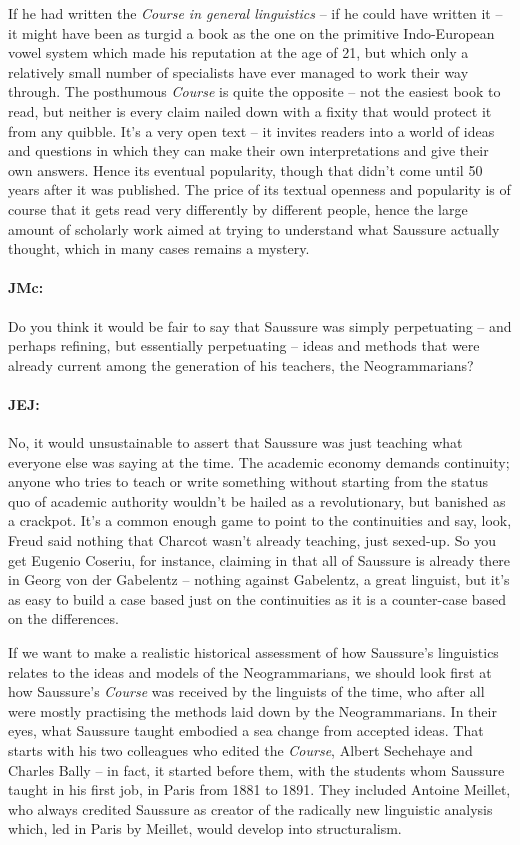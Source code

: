 \documentclass[output=paper]{langscibook}
\begin{document}
If he had written the \textit{Course in general linguistics} – if he could have written it – it might have been as turgid a book as the one on the primitive Indo-European vowel system which made his reputation at the age of 21, but which only a relatively small number of specialists have ever managed to work their way through. The posthumous \textit{Course} is quite the opposite – not the easiest book to read, but neither is every claim nailed down with a fixity that would protect it from any quibble. It’s a very open text – it invites readers into a world of ideas and questions in which they can make their own interpretations and give their own answers. Hence its eventual popularity, though that didn’t come until 50 years after it was published. The price of its textual openness and popularity is of course that it gets read very differently by different people, hence the large amount of scholarly work aimed at trying to understand what Saussure actually thought, which in many cases remains a mystery.


\paragraph*{JMc:}  Do you think it would be fair to say that Saussure was simply perpetuating – and perhaps refining, but essentially perpetuating – ideas and methods that were already current among the generation of his teachers, the Neogrammarians?


\paragraph*{JEJ:}  No, it would unsustainable to assert that Saussure was just teaching what everyone else was saying at the time. The academic economy demands continuity; anyone who tries to teach or write something without starting from the status quo of academic authority wouldn’t be hailed as a revolutionary, but banished as a crackpot. It’s a common enough game to point to the continuities and say, look, Freud said nothing that Charcot wasn’t already teaching, just sexed-up. So you get Eugenio Coseriu, for instance, claiming in \citeyear{coseriu1967a} that all of Saussure is already there in Georg von der Gabelentz – nothing against Gabelentz, a great linguist, but it’s as easy to build a case based just on the continuities as it is a counter-case based on the differences.

If we want to make a realistic historical assessment of how Saussure’s linguistics relates to the ideas and models of the Neogrammarians, we should look first at how Saussure’s \textit{Course} was received by the linguists of the time, who after all were mostly practising the methods laid down by the Neogrammarians. In their eyes, what Saussure taught embodied a sea change from accepted ideas. That starts with his two colleagues who edited the \textit{Course}, Albert Sechehaye and Charles Bally – in fact, it started before them, with the students whom Saussure taught in his first job, in Paris from 1881 to 1891. They included Antoine Meillet, who always credited Saussure as creator of the radically new linguistic analysis which, led in Paris by Meillet, would develop into structuralism. 
\end{document}

